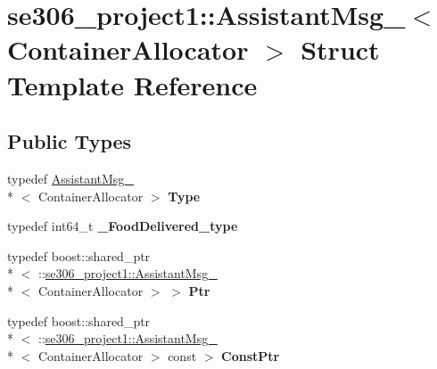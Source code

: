 \hypertarget{structse306__project1_1_1AssistantMsg__}{\section{se306\-\_\-project1\-:\-:Assistant\-Msg\-\_\-$<$ Container\-Allocator $>$ Struct Template Reference}
\label{structse306__project1_1_1AssistantMsg__}
}
\subsection*{Public Types}
\begin{DoxyCompactItemize}
\item 
\hypertarget{structse306__project1_1_1AssistantMsg___a1fd81595948c57178036f385b43b3e85}{typedef \hyperlink{structse306__project1_1_1AssistantMsg__}{Assistant\-Msg\-\_\-}\\*
$<$ Container\-Allocator $>$ {\bfseries Type}}\label{structse306__project1_1_1AssistantMsg___a1fd81595948c57178036f385b43b3e85}

\item 
\hypertarget{structse306__project1_1_1AssistantMsg___aec66b7b1d73c662979534e5c2b6b3c5b}{typedef int64\-\_\-t {\bfseries \-\_\-\-Food\-Delivered\-\_\-type}}\label{structse306__project1_1_1AssistantMsg___aec66b7b1d73c662979534e5c2b6b3c5b}

\item 
\hypertarget{structse306__project1_1_1AssistantMsg___ae4e951cbe451656c3432adc85dac1d27}{typedef boost\-::shared\-\_\-ptr\\*
$<$ \-::\hyperlink{structse306__project1_1_1AssistantMsg__}{se306\-\_\-project1\-::\-Assistant\-Msg\-\_\-}\\*
$<$ Container\-Allocator $>$ $>$ {\bfseries Ptr}}\label{structse306__project1_1_1AssistantMsg___ae4e951cbe451656c3432adc85dac1d27}

\item 
\hypertarget{structse306__project1_1_1AssistantMsg___a96808a76b3826b3fe60f4733c576bb10}{typedef boost\-::shared\-\_\-ptr\\*
$<$ \-::\hyperlink{structse306__project1_1_1AssistantMsg__}{se306\-\_\-project1\-::\-Assistant\-Msg\-\_\-}\\*
$<$ Container\-Allocator $>$ const  $>$ {\bfseries Const\-Ptr}}\label{structse306__project1_1_1AssistantMsg___a96808a76b3826b3fe60f4733c576bb10}

\end{DoxyCompactItemize}
